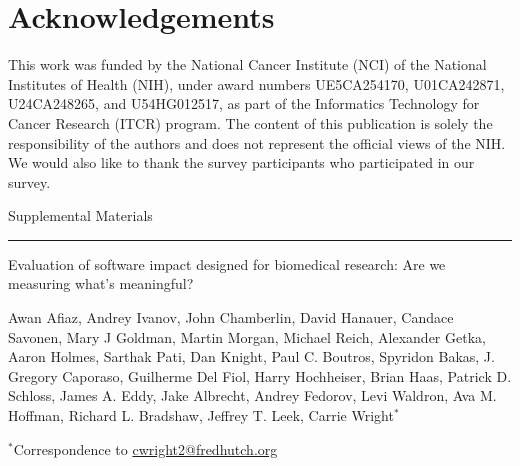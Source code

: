 \documentclass{article}
\begin{document}
\section{Acknowledgements}

This work was funded by the National Cancer Institute (NCI) of the National Institutes of Health (NIH), under award numbers UE5CA254170, U01CA242871, U24CA248265, and U54HG012517, as part of the Informatics Technology for Cancer Research (ITCR) program. The content of this publication is solely the responsibility of the authors and does not represent the official views of the NIH. We would also like to thank the survey participants who participated in our survey.



 
 




\clearpage
\onecolumn



{\huge Supplemental Materials}

\hrule

\vspace*{0.5cm}

\begin{center}

{\Large Evaluation of software impact designed for biomedical research: Are we measuring what's meaningful?}

\vspace*{0.75cm}

{\large Awan Afiaz,  Andrey Ivanov, John Chamberlin, David Hanauer, Candace Savonen, Mary J Goldman, Martin Morgan, Michael Reich,  Alexander Getka, Aaron Holmes, Sarthak Pati, Dan Knight,  Paul C. Boutros, Spyridon Bakas, J. Gregory Caporaso,  Guilherme Del Fiol, Harry Hochheiser, Brian Haas, Patrick D. Schloss, James A. Eddy, Jake Albrecht, Andrey Fedorov, Levi Waldron, Ava M. Hoffman, Richard L. Bradshaw, Jeffrey T. Leek, Carrie Wright$^*$}

\vspace*{0.3cm}

{\small $^*$Correspondence to \url{cwright2@fredhutch.org}}

\end{center}
\end{document}
